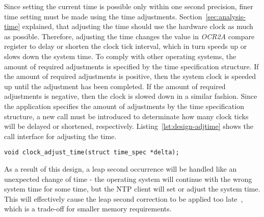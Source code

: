 Since setting the current time is possible only within one second precision,
finer time setting must be made using the time adjustments.
Section~\ref{sec:analysis-time} explained, that adjusting the time
should use the hardware clock as much as possible.
Therefore, adjusting the time changes the value in {\it{OCR2A}} compare register
to delay or shorten the clock tick interval,
which in turn speeds up or slows down the system time.
To comply with other operating systems,
the amount of required adjustments is specified by the time specification structure.
If the amount of required adjustments is positive, then the system clock is speeded up
until the adjustment has been completed.
If the amount of required adjustments is negative, then the clock is slowed down in a similar fashion.
Since the application specifies the amount of adjustments by the time specification structure,
a new call must be introduced to determinate how many
clock ticks will be delayed or shortened, respectively.
Listing~\ref{lst:design-adjtime} shows the call interface for adjusting the time.
\begin{lstlisting}[caption={Call interface for adjusting the time},label={lst:design-adjtime}]
void clock_adjust_time(struct time_spec *delta);
\end{lstlisting}

As a result of this design, a leap second occurrence will be handled like an unexpected change of time -
the operating system will continue with the wrong system time for some time,
but the NTP client will set or adjust the system time.
This will effectively cause the leap second correction to be applied too late~\cite{ntp-faq},
which is a trade-off for smaller memory requirements.
